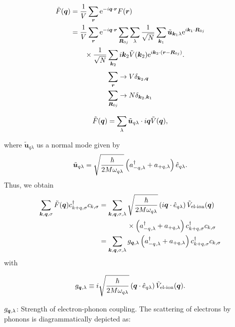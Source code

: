 \begin{align}
\tilde{F}(\bm{q}) &= \frac{1}{V}\sum_{\bm{r}}\mathrm{e}^{-i\bm{q}\cdot\bm{r}}F(\bm{r}) \\
&= \frac{1}{V}\sum_{\bm{r}}\mathrm{e}^{-i\bm{q}\cdot\bm{r}} \sum_{\bm{R}_{0j}}\sum_{\lambda}\frac{1}{\sqrt{N}}\sum_{\bm{k}_1}\tilde{\bm{u}}_{\bm{k}_1\lambda}\mathrm{e}^{i\bm{k}_1\cdot\bm{R}_{0j}} \\
&\qquad\times \frac{1}{\sqrt{N}}\sum_{\bm{k}_2}i\bm{k}_2\tilde{V}(\bm{k}_2)\mathrm{e}^{i\bm{k}_2\cdot(\bm{r}-\bm{R}_{0j})}.
\end{align}
\begin{align}
	\sum_{\bm{r}} &\rightarrow V\delta_{\bm{k}_2,\bm{q}} \\
	\sum_{\bm{R}_{0j}} &\rightarrow N\delta_{\bm{k}_2,\bm{k}_1}
\end{align}
\begin{tcolorbox}
	\begin{equation}
		\tilde{F}(\bm{q}) = \sum_{\lambda} \tilde{\bm{u}}_{q\lambda}\cdot i\bm{q} \tilde{V}(\bm{q}),
	\end{equation}
\end{tcolorbox}
where $\tilde{\bm{u}}_{q\lambda}$ us a normal mode given by 
\begin{equation}
	\tilde{\bm{u}}_{q\lambda} = \sqrt{\frac{\hbar}{2M\omega_{q\lambda}}}\left (a_{-q,\lambda}^{\dagger} + a_{+q,\lambda}\right )\hat{e}_{q\lambda}.
\end{equation}
Thus, we obtain
\begin{align}
	\sum_{\bm{k},\bm{q},\sigma}\tilde{F}(\bm{q})c^{\dagger}_{k+q,\sigma}c_{k,\sigma} &= \sum_{\bm{k},\bm{q},\sigma,\lambda}\sqrt{\frac{\hbar}{2M\omega_{q\lambda}}}\left (i\bm{q}\cdot\hat{e}_{q\lambda}\right )\tilde{V}_{\text{el-ion}}(\bm{q})\\
	& \qquad \qquad \times \left (a_{-q,\lambda}^{\dagger} + a_{+q,\lambda}\right )c^{\dagger}_{k+q,\sigma}c_{k,\sigma} \\
	&= \sum_{\bm{k},\bm{q},\sigma,\lambda}g_{\bm{q},\lambda}\left (a_{-q,\lambda}^{\dagger} + a_{+q,\lambda}\right )c^{\dagger}_{k+q,\sigma}c_{k,\sigma}
\end{align}
with
\begin{tcolorbox}
	\begin{equation}
		g_{\bm{q},\lambda} \equiv i\sqrt{\frac{\hbar}{2M\omega_{q\lambda}}}\left (\bm{q}\cdot\hat{e}_{q\lambda}\right )\tilde{V}_{\text{el-ion}}(\bm{q}).
	\end{equation}
\end{tcolorbox}
$g_{\bm{q},\lambda}$: Strength of electron-phonon coupling. 
The scattering of electrons by phonons is diagrammatically depicted as:
